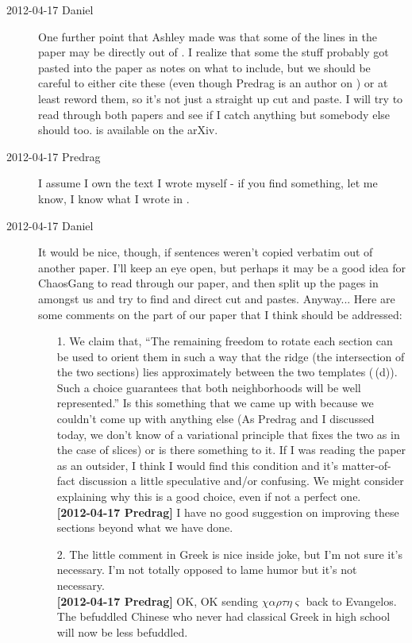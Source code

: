 \begin{description}
\item[2012-04-17 Daniel] One further point that Ashley made was that some
of the lines in the paper may be directly out of . I
realize that some the stuff probably got pasted into the paper as notes
on what to include, but we should be careful to either cite these (even
though Predrag is an author on ) or at least reword them,
so it's not just a straight up cut and paste. I will try to read through
both papers and see if I catch anything but somebody else should too.
 is available on the arXiv.

\item[2012-04-17 Predrag] I assume I own the text I wrote myself - if you
find something, let me know, I know what I wrote in .

\item[2012-04-17 Daniel] It would be nice, though, if sentences weren't copied
verbatim out of another paper. I'll keep an eye open, but perhaps it may be a
good idea for ChaosGang to read through our paper, and then split up the pages
in  amongst us and try to find and direct cut and pastes. Anyway...
Here are some comments on the \PoincSec part of our paper that I think should be addressed:
	\begin{itemize}
		\item[1.] We claim that, ``The remaining freedom to rotate each section can be
		used to orient them in such a way that the ridge (the intersection of the
		two sections) lies approximately between the two templates (\,(d)).
		Such a choice guarantees that both neighborhoods will be well represented.'' Is this
		something that we came up with because we couldn't come up with anything else
		(As Predrag and I discussed today, we don't know of a variational principle
		that fixes the two as in the case of slices) or is there something to it. If I
		was reading the paper as an outsider, I think I would find this condition and
		it's matter-of-fact discussion a little speculative and/or confusing. We might
		consider explaining why this is a good choice, even if not a perfect one.
        \\{\bf [2012-04-17 Predrag]} I have no good suggestion on improving these sections
        beyond what we have done.

		\item[2.] The little comment in Greek is nice inside joke, but
        I'm not sure it's necessary. I'm not totally opposed to lame humor but
        it's not necessary.
        \\{\bf [2012-04-17 Predrag]} OK, OK sending
        $\chi\alpha\rho\tau\eta\varsigma$ back to Evangelos. The
        befuddled Chinese who never had classical Greek in high school
        will now be less befuddled.


\end{itemize}
\end{description}
